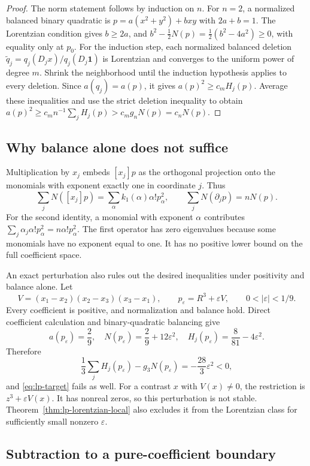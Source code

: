 \documentclass[11pt,a4paper]{article}
\theoremstyle{definition}
\theoremstyle{remark}
\begin{document}
\begin{proof}
The norm statement follows by induction on $n$.
For $n=2$, a normalized balanced binary quadratic is
$p=a(x^2+y^2)+bxy$ with $2a+b=1$.
The Lorentzian condition gives $b\ge2a$, and
$b^2-\tfrac12N(p)=\tfrac12(b^2-4a^2)\ge0$, with equality only at $p_0$.
For the induction step, each normalized balanced deletion
$\widetilde q_j=q_j(D_jx)/q_j(D_j\mathbf1)$ is Lorentzian and converges to the uniform power of degree $m$.
Shrink the neighborhood until the induction hypothesis applies to every deletion.
Since $a(q_j)=a(p)$, it gives $a(p)^2\ge c_mH_j(p)$.
Average these inequalities and use the strict deletion inequality to obtain
$a(p)^2\ge c_m n^{-1}\sum_jH_j(p)>c_mg_nN(p)=c_nN(p)$.
\end{proof}

\subsection{Why balance alone does not suffice}

Multiplication by $x_j$ embeds $[x_j]p$ as the orthogonal projection onto the monomials with exponent exactly one in coordinate $j$.
Thus
\[
 \sum_jN([x_j]p)=\sum_\alpha k_1(\alpha)\alpha!p_\alpha^2,
 \qquad \sum_jN(\partial_jp)=nN(p).
\]
For the second identity, a monomial with exponent $\alpha$ contributes
$\sum_j\alpha_j\alpha!p_\alpha^2=n\alpha!p_\alpha^2$.
The first operator has zero eigenvalues because some monomials have no exponent equal to one.
It has no positive lower bound on the full coefficient space.

An exact perturbation also rules out the desired inequalities under positivity and balance alone.
Let
\[
 V=(x_1-x_2)(x_2-x_3)(x_3-x_1),\qquad
 p_\varepsilon=R^3+\varepsilon V,\qquad 0<|\varepsilon|<1/9.
\]
Every coefficient is positive, and normalization and balance hold.
Direct coefficient calculation and binary-quadratic balancing give
\[
 a(p_\varepsilon)=\frac29,\quad N(p_\varepsilon)=\frac29+12\varepsilon^2,
 \quad H_j(p_\varepsilon)=\frac8{81}-4\varepsilon^2.
\]
Therefore
\[
 \frac13\sum_jH_j(p_\varepsilon)-g_3N(p_\varepsilon)
 =-\frac{28}{3}\varepsilon^2<0,
\]
and \eqref{eq:lp-target} fails as well.
For a contrast $x$ with $V(x)\ne0$, the restriction is $z^3+\varepsilon V(x)$.
It has nonreal zeros, so this perturbation is not stable.
Theorem~\ref{thm:lp-lorentzian-local} also excludes it from the Lorentzian class for sufficiently small nonzero $\varepsilon$.

\subsection{Subtraction to a pure-coefficient boundary}
\end{document}
